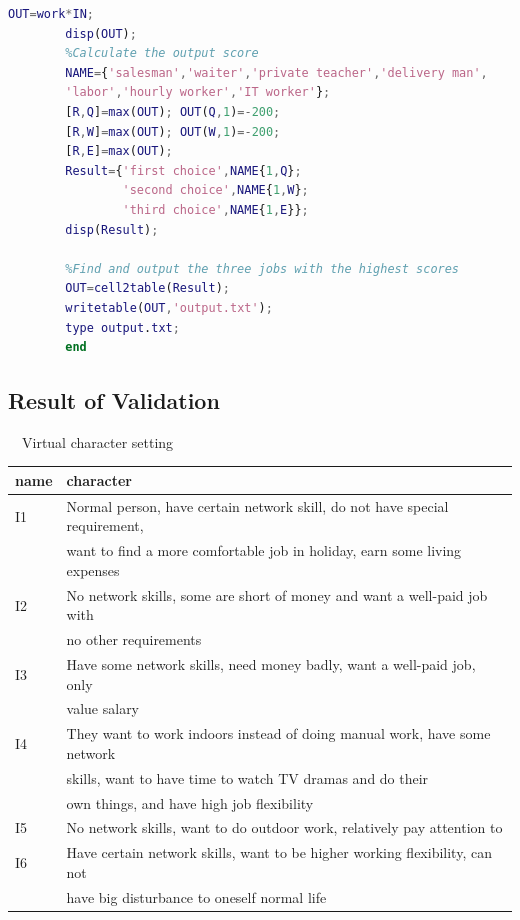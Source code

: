 \documentclass[12pt]{article}
\begin{document}
\begin{appendix}
\begin{lstlisting}[language=Matlab]
        OUT=work*IN;
        disp(OUT);
        %Calculate the output score
        NAME={'salesman','waiter','private teacher','delivery man',
        'labor','hourly worker','IT worker'};
        [R,Q]=max(OUT); OUT(Q,1)=-200;
        [R,W]=max(OUT); OUT(W,1)=-200;
        [R,E]=max(OUT);
        Result={'first choice',NAME{1,Q};
                'second choice',NAME{1,W};
                'third choice',NAME{1,E}};
        disp(Result);

        %Find and output the three jobs with the highest scores
        OUT=cell2table(Result);
        writetable(OUT,'output.txt');
        type output.txt;
        end
    \end{lstlisting}
    \subsection{Result of Validation}
        ~~Virtual character setting%
        \begin{table}[]
            \begin{tabular}{ll}
            name & character\\
            \hline
            I1   & Normal person, have certain network skill, do not have special requirement,\\ & want to find a more comfortable job in holiday, earn some living expenses                         \\
            I2   & No network skills, some are short of money and want a well-paid job with \\ &no other requirements                                                                                  \\
            I3   & Have some network skills, need money badly, want a well-paid job, only \\ & value salary                                                                                             \\
            I4   & They want to work indoors instead of doing manual work, have some network\\ &  skills, want to have time to  watch TV dramas and do their \\ & own things, and have high job flexibility \\
            I5   & No network skills, want to do outdoor work, relatively pay attention to                                                                                                         \\
            I6   & Have certain network skills, want to be higher working flexibility, can not\\ &  have big disturbance to oneself normal life                                                       \\

\end{tabular}
\end{table}
\end{appendix}
\end{document}
